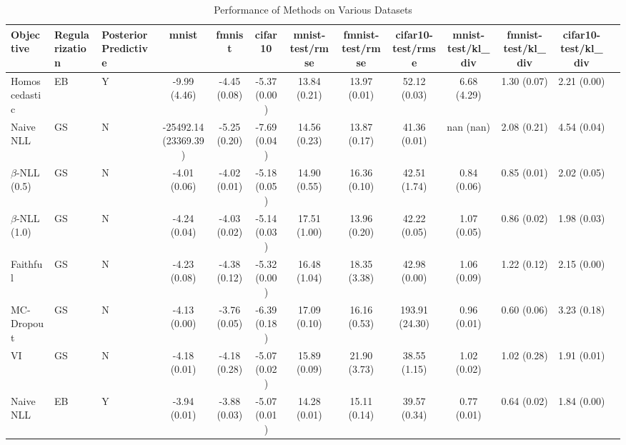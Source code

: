 \begin{table}
\centering
\caption{Performance of Methods on Various Datasets}
\label{tab:results}
\begin{tabular}{|l|l|l|c|c|c|c|c|c|c|c|c|c|}
\toprule
        Objective & Regularization & Posterior Predictive &                mnist &       fmnist &      cifar10 & mnist-test/rmse & fmnist-test/rmse & cifar10-test/rmse & mnist-test/kl_div & fmnist-test/kl_div & cifar10-test/kl_div \\
\midrule
    Homoscedastic &             EB &                    Y &         -9.99 (4.46) & -4.45 (0.08) & -5.37 (0.00) &    13.84 (0.21) &     13.97 (0.01) &      52.12 (0.03) &       6.68 (4.29) &        1.30 (0.07) &         2.21 (0.00) \\
        Naive NLL &             GS &                    N & -25492.14 (23369.39) & -5.25 (0.20) & -7.69 (0.04) &    14.56 (0.23) &     13.87 (0.17) &      41.36 (0.01) &         nan (nan) &        2.08 (0.21) &         4.54 (0.04) \\
$\beta$-NLL (0.5) &             GS &                    N &         -4.01 (0.06) & -4.02 (0.01) & -5.18 (0.05) &    14.90 (0.55) &     16.36 (0.10) &      42.51 (1.74) &       0.84 (0.06) &        0.85 (0.01) &         2.02 (0.05) \\
$\beta$-NLL (1.0) &             GS &                    N &         -4.24 (0.04) & -4.03 (0.02) & -5.14 (0.03) &    17.51 (1.00) &     13.96 (0.20) &      42.22 (0.05) &       1.07 (0.05) &        0.86 (0.02) &         1.98 (0.03) \\
         Faithful &             GS &                    N &         -4.23 (0.08) & -4.38 (0.12) & -5.32 (0.00) &    16.48 (1.04) &     18.35 (3.38) &      42.98 (0.00) &       1.06 (0.09) &        1.22 (0.12) &         2.15 (0.00) \\
       MC-Dropout &             GS &                    N &         -4.13 (0.00) & -3.76 (0.05) & -6.39 (0.18) &    17.09 (0.10) &     16.16 (0.53) &    193.91 (24.30) &       0.96 (0.01) &        0.60 (0.06) &         3.23 (0.18) \\
               VI &             GS &                    N &         -4.18 (0.01) & -4.18 (0.28) & -5.07 (0.02) &    15.89 (0.09) &     21.90 (3.73) &      38.55 (1.15) &       1.02 (0.02) &        1.02 (0.28) &         1.91 (0.01) \\
        Naive NLL &             EB &                    Y &         -3.94 (0.01) & -3.88 (0.03) & -5.07 (0.01) &    14.28 (0.01) &     15.11 (0.14) &      39.57 (0.34) &       0.77 (0.01) &        0.64 (0.02) &         1.84 (0.00) \\

\end{tabular}
\end{table}
